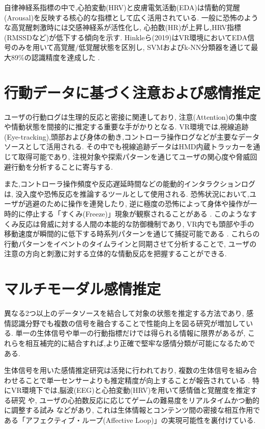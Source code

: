 \documentclass[book,paper=a4,fontsize=10pt,jafontscale=0.92]{jlreq}
\begin{document}
自律神経系指標の中で,心拍変動(HRV)と皮膚電気活動(EDA)は情動的覚醒(Arousal)を反映する核心的な指標として広く活用されている.
一般に恐怖のような高覚醒刺激時には交感神経系が活性化し,
心拍数(HR)が上昇し,HRV指標(RMSSDなど)が低下する傾向を示す.
Hinkleら(2019)はVR環境においてEDA信号のみを用いて高覚醒/低覚醒状態を区別し,
SVMおよびk-NN分類器を通じて最大89\%の認識精度を達成した \cite{Hinkle2019}.

\section{行動データに基づく注意および感情推定}

ユーザの行動ログは生理的反応と密接に関連しており,
注意(Attention)の集中度や情動状態を間接的に推定する重要な手がかりとなる.
VR環境では,視線追跡(Eye-tracking),頭部および身体の動き,コントローラ操作ログなどが主要なデータソースとして活用される.
その中でも視線追跡データはHMD内蔵トラッカーを通じて取得可能であり,
注視対象や探索パターンを通じてユーザの関心度や脅威回避行動を分析することに寄与する.

また,コントローラ操作頻度や反応遅延時間などの能動的インタラクションログは,
没入度や恐怖反応を推論するツールとして使用される.
恐怖状況において,ユーザが逃避のために操作を連発したり,
逆に極度の恐怖によって身体や操作が一時的に停止する「すくみ(Freeze)」現象が観察されることがある \cite{Pajic2025}.
このようなすくみ反応は脅威に対する人間の本能的な防御機制であり,
VR内でも頭部や手の移動速度が瞬間的に低下する時系列パターンを通じて捕捉可能である \cite{Lin2017}.
これらの行動パターンをイベントのタイムラインと同期させて分析することで,
ユーザの注意の方向と刺激に対する立体的な情動反応を把握することができる.

\section{マルチモーダル感情推定}

異なる2つ以上のデータソースを結合して対象の状態を推定する方法であり,
感情認識分野でも複数の信号を融合することで性能向上を図る研究が増加している.
単一の生体信号や単一の行動指標だけでは得られる情報に限界があるが,
これらを相互補完的に結合すれば,より正確で堅牢な感情分類が可能になるためである.

生体信号を用いた感情推定研究は活発に行われており,
複数の生体信号を組み合わせることで単一センサーよりも推定精度が向上することが報告されている \cite{MarinMorales2020, Cimtay2020}.
特にVR環境下では,脳波(EEG)と心拍変動(HRV)を用いて感情価と覚醒度を推定する研究 \cite{MarinMorales2018}や,
ユーザの心拍数反応に応じてゲームの難易度をリアルタイムかつ動的に調整する試み \cite{OrozcoMora2024}などがあり,
これは生体情報とコンテンツ間の密接な相互作用である「アフェクティブ・ループ(Affective Loop)」の実現可能性を裏付けている.
\end{document}
